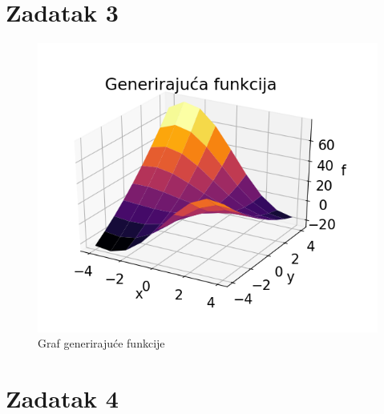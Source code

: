 \documentclass[times, utf8, seminar]{fer}
\begin{document}
\chapter{Zadatak 3}

\begin{figure}[H]
    \includegraphics[scale=0.9]{img/generirajuca.png}
    \caption{Graf generirajuće funkcije}
\end{figure}

\chapter{Zadatak 4}
\end{document}
